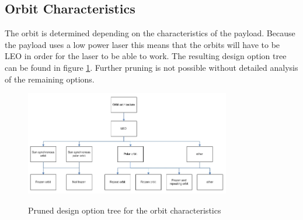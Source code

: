\subsection{Orbit Characteristics}
\label{mtrTOprunedOrbit}
The orbit is determined depending on the characteristics of the payload. Because the payload uses a low power laser this means that the orbits will have to be \ac{LEO} in order for the laser to be able to work. The resulting design option tree can be found in figure \ref{fig:mtrTOPrunedOrbit}. Further pruning is not possible without detailed analysis of the remaining options.

\begin{figure}
\includegraphics[width=0.8\textwidth, angle=0]{chapters/img/PrunedOrbit.jpg}
\label{fig:mtrTOPrunedOrbit}
\caption{Pruned design option tree for the orbit characteristics}
\end{figure}